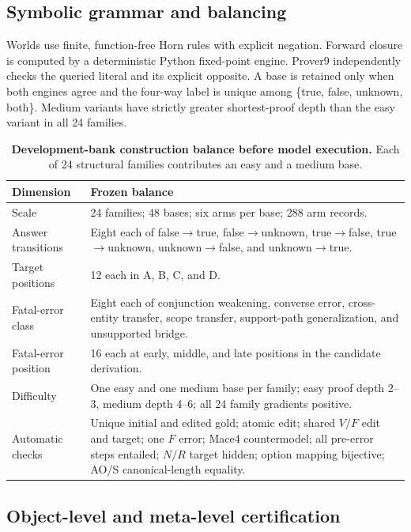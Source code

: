 \documentclass[letterpaper]{article}
\begin{document}
\subsection{Symbolic grammar and balancing}

Worlds use finite, function-free Horn rules with explicit negation.  Forward closure is computed by a deterministic Python fixed-point engine.  Prover9 independently checks the queried literal and its explicit opposite.  A base is retained only when both engines agree and the four-way label is unique among \{true, false, unknown, both\}.  Medium variants have strictly greater shortest-proof depth than the easy variant in all 24 families.

\begin{table}[t]
\centering
\small
\begin{tabular}{L{3.0cm}L{10.7cm}}
\toprule
Dimension & Frozen balance \\
\midrule
Scale & 24 families; 48 bases; six arms per base; 288 arm records. \\
Answer transitions & Eight each of false$\rightarrow$true, false$\rightarrow$unknown, true$\rightarrow$false, true$\rightarrow$unknown, unknown$\rightarrow$false, and unknown$\rightarrow$true. \\
Target positions & 12 each in A, B, C, and D. \\
Fatal-error class & Eight each of conjunction weakening, converse error, cross-entity transfer, scope transfer, support-path generalization, and unsupported bridge. \\
Fatal-error position & 16 each at early, middle, and late positions in the candidate derivation. \\
Difficulty & One easy and one medium base per family; easy proof depth 2--3, medium depth 4--6; all 24 family gradients positive. \\
Automatic checks & Unique initial and edited gold; atomic edit; shared $V/F$ edit and target; one $F$ error; Mace4 countermodel; all pre-error steps entailed; $N/R$ target hidden; option mapping bijective; AO/S canonical-length equality. \\
\bottomrule
\end{tabular}
\caption{\textbf{Development-bank construction balance before model execution.} Each of 24 structural families contributes an easy and a medium base.}
\label{tab:supp-data-balance}
\end{table}

\subsection{Object-level and meta-level certification}
\end{document}
